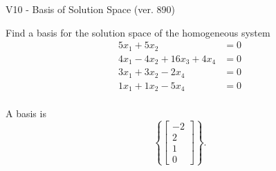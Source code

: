 \begin{exercise}
  \begin{exerciseTitle}V10 - Basis of Solution Space (ver. 890)\end{exerciseTitle}
  \begin{exerciseStatement}
    Find a basis for the solution space of the homogeneous system 
\begin{align*}
 5 x_ 1 + 5 x_ 2 &= 0  \\ 
  4 x_ 1 -4 x_ 2 + 16 x_ 3 + 4 x_ 4 &= 0  \\ 
  3 x_ 1 + 3 x_ 2 -2 x_ 4 &= 0  \\ 
  1 x_ 1 + 1 x_ 2 -5 x_ 4 &= 0  \\ 
 \end{align*}


 
  \end{exerciseStatement}

  \begin{exerciseAnswer}
   A basis is   
\[\left\{\left[\begin{array}{c}
-2 \\
2 \\
1 \\
0
\end{array}\right]\right\}.\]

  


  \end{exerciseAnswer}
\end{exercise}